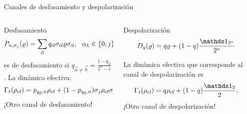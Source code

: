 \begin{frame}{Canales de desfasamiento y despolarización}
    \begin{columns}
        \begin{column}{0.5\textwidth}
            \begin{block}{Desfasamiento}
                \begin{equation}
                    P_{n,\sigma_{j}}(\varrho)=\sum_{\vec{\alpha}}q_{\vec{\alpha}}\sigma_{\vec{\alpha}}\varrho\sigma_{\vec{\alpha}}, \,\text{ }\, \alpha_{k}\in\{0,j\}\nonumber
                \end{equation}\pause
                es  de desfasamiento si $q_{\vec{\alpha}\neq\vec{0}}=\frac{1-q_{\vec{0} }}{2^{n}-1}$. \pause La dinámica efectiva: 
                \begin{equation}
                    \Gamma_{t}(\rho_{\text{ef}})=p_{q_{\vec{0}},n}\rho_{\text{ef}}+(1-p_{q_{\vec{0}},n})\sigma_{j}\rho_{\text{ef}}\sigma_{j}.\nonumber
                \end{equation}
                ¡Otro canal de desfasamiento!
            \end{block}
        \end{column}\pause
        \begin{column}{0.5\textwidth}
            \begin{block}{Despolarización}
                \vspace{0.3cm}
                \begin{equation}
                    D_{q}(\varrho)=q\varrho+(1-q)\frac{\Id_{2^{n}}}{2^n}\nonumber
            \end{equation}\pause
            \vspace{0.3cm}
            
                La dinámica efectiva que corresponde al canal de despolarización es\pause
                \begin{equation}
                    \Gamma_{t}(\rho_{\ef})=q\rho_{\ef}+(1-q)\frac{\Id_{2}}{2},\nonumber
                \end{equation}\pause
                ¡Otro canal de despolarización!
            \end{block}
        \end{column}
    \end{columns}
\end{frame}

